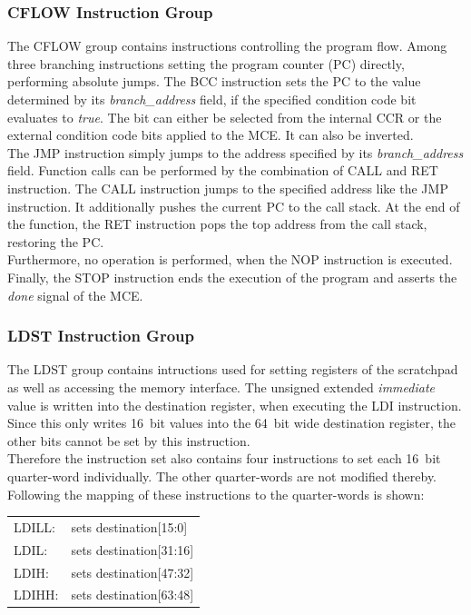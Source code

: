 \subsubsection{CFLOW Instruction Group}

The CFLOW group contains instructions controlling the program flow.
Among three branching instructions setting the program counter (PC) directly, performing absolute jumps.
The BCC instruction sets the PC to the value determined by its \emph{branch\_address} field, if the specified condition code bit evaluates to \emph{true}.
The bit can either be selected from the internal CCR or the external condition code bits applied to the MCE.
It can also be inverted.\\
The JMP instruction simply jumps to the address specified by its \emph{branch\_address} field.
Function calls can be performed by the combination of CALL and RET instruction.
The CALL instruction jumps to the specified address like the JMP instruction.
It additionally pushes the current PC to the call stack.
At the end of the function, the RET instruction pops the top address from the call stack, restoring the PC.\\
Furthermore, no operation is performed, when the NOP instruction is executed.
Finally, the STOP instruction ends the execution of the program and asserts the \emph{done} signal of the MCE.

\subsubsection{LDST Instruction Group}

The LDST group contains intructions used for setting registers of the scratchpad as well as accessing the memory interface.
The unsigned extended \emph{immediate} value is written into the destination register, when executing the LDI instruction.
Since this only writes 16~bit values into the 64~bit wide destination register, the other bits cannot be set by this instruction.\\
Therefore the instruction set also contains four instructions to set each 16~bit quarter-word individually.
The other quarter-words are not modified thereby.
Following the mapping of these instructions to the quarter-words is shown:\\

\begin{tabular}{l l}
    LDILL: & sets destination[15:0]  \\
    LDIL:  & sets destination[31:16] \\
    LDIH:  & sets destination[47:32] \\
    LDIHH: & sets destination[63:48] \\
\end{tabular}


